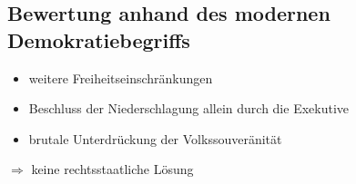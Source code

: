
\subsection*{Bewertung anhand des modernen Demokratiebegriffs}

\begin{itemize}
\item weitere Freiheitseinschränkungen
\item Beschluss der Niederschlagung allein durch die Exekutive
\item brutale Unterdrückung der Volkssouveränität
\end{itemize}

$\Longrightarrow$ keine rechtsstaatliche Lösung 

\endinput
